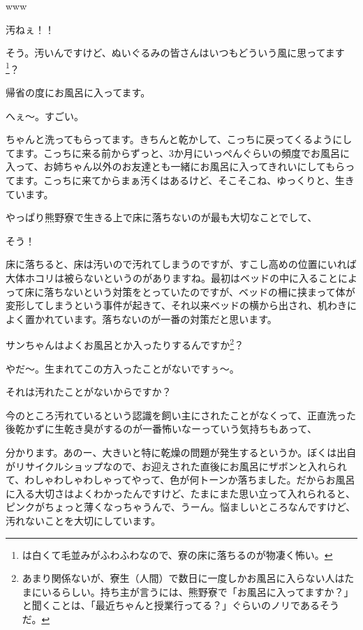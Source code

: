 \documentclass[9pt,4aj]{jsarticle}
\begin{document}
\begin{multicols}{2}
www

汚ねぇ！！

そう。汚いんですけど、ぬいぐるみの皆さんはいつもどういう風に思ってます\footnote{は白くて毛並みがふわふわなので、寮の床に落ちるのが物凄く怖い。}？

帰省の度にお風呂に入ってます。

へぇ～。すごい。

ちゃんと洗ってもらってます。きちんと乾かして、こっちに戻ってくるようにしてます。こっちに来る前からずっと、3か月にいっぺんぐらいの頻度でお風呂に入って、お姉ちゃん以外のお友達とも一緒にお風呂に入ってきれいにしてもらってます。こっちに来てからまぁ汚くはあるけど、そこそこね、ゆっくりと、生きています。

やっぱり熊野寮で生きる上で床に落ちないのが最も大切なことでして、

そう！

床に落ちると、床は汚いので汚れてしまうのですが、すこし高めの位置にいれば大体ホコリは被らないというのがありますね。最初はベッドの中に入ることによって床に落ちないという対策をとっていたのですが、ベッドの柵に挟まって体が変形してしまうという事件が起きて、それ以来ベッドの横から出され、机わきによく置かれています。落ちないのが一番の対策だと思います。

サンちゃんはよくお風呂とか入ったりするんですか\footnote{あまり関係ないが、寮生（人間）で数日に一度しかお風呂に入らない人はたまにいるらしい。持ち主が言うには、熊野寮で「お風呂に入ってますか？」と聞くことは、「最近ちゃんと授業行ってる？」ぐらいのノリであるそうだ。}？

やだ～。生まれてこの方入ったことがないですぅ～。

それは汚れたことがないからですか？

今のところ汚れているという認識を飼い主にされたことがなくって、正直洗った後乾かずに生乾き臭がするのが一番怖いなーっていう気持ちもあって、

分かります。あのー、大きいと特に乾燥の問題が発生するというか。ぼくは出自がリサイクルショップなので、お迎えされた直後にお風呂にザボンと入れられて、わしゃわしゃわしゃってやって、色が何トーンか落ちました。だからお風呂に入る大切さはよくわかったんですけど、たまにまた思い立って入れられると、ピンクがちょっと薄くなっちゃうんで、うーん。悩ましいところなんですけど、汚れないことを大切にしています。


\end{multicols}
\end{document}

